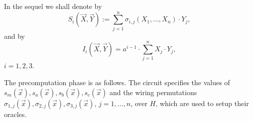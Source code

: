 \documentclass[11pt]{article}
\theoremstyle{definition}
\theoremstyle{remark}
\begin{document}
In the sequel we shall denote by
\begin{equation}
\label{e:Si}
S_i(\vec X, \vec Y) :=\sum_{j=1}^n \sigma_{i,j}(X_1,\ldots, X_n)\cdot Y_j,
\end{equation}
and by
\begin{equation}
\label{e:Ii}
I_i(\vec X,\vec Y) = a^{i-1}\cdot \sum_{j=1}^n X_j\cdot Y_j,
\end{equation}
$i=1,2,3$.

The precomputation phase is as follows.
The circuit specifies the values of $s_m(\vec x), s_a(\vec x), s_b(\vec x), s_c(\vec x)$ and the wiring permutations $\sigma_{1,j}(\vec x),\sigma_{2,j}(\vec x), \sigma_{3,j}(\vec x)$, $j=1,\ldots,n$, over $H$, which are used to setup their oracles.
\end{document}
